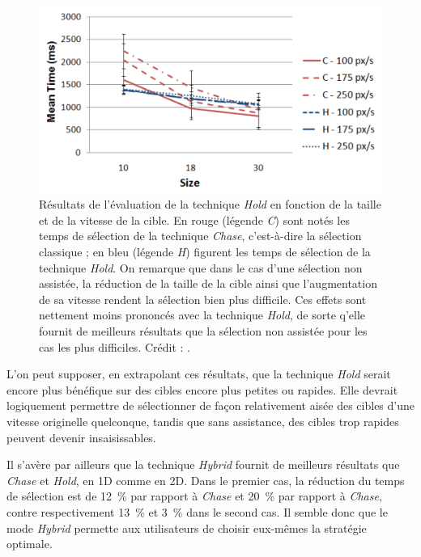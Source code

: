 	\begin{figure}[H]
		\centering
		\includegraphics[width=\textwidth]{figures/ch2/holdSFast}
		\caption[\emph{Hold} --- petites cibles rapides]{Résultats de l'évaluation de la technique \emph{Hold} en fonction de la taille et de la vitesse de la cible. En rouge (légende \emph{C}) sont notés les temps de sélection de la technique \emph{Chase}, c'est-à-dire la sélection classique ; en bleu (légende \emph{H}) figurent les temps de sélection de la technique \emph{Hold}. On remarque que dans le cas d'une sélection non assistée, la réduction de la taille de la cible ainsi que l'augmentation de sa vitesse rendent la sélection bien plus difficile. Ces effets sont nettement moins prononcés avec la technique \emph{Hold}, de sorte q'elle fournit de meilleurs résultats que la sélection non assistée pour les cas les plus difficiles. Crédit : \cite{hajri2011moving}.}
		\label{fig:holdSFast}
	\end{figure}
	
	L'on peut supposer, en extrapolant ces résultats, que la technique \emph{Hold} serait encore plus bénéfique sur des cibles encore plus petites ou rapides. Elle devrait logiquement permettre de sélectionner de façon relativement aisée des cibles d'une vitesse originelle quelconque, tandis que sans assistance, des cibles trop rapides peuvent devenir insaisissables.
	
	Il s'avère par ailleurs que la technique \emph{Hybrid} fournit de meilleurs résultats que \emph{Chase} et \emph{Hold}, en 1D comme en 2D. Dans le premier cas, la réduction du temps de sélection est de 12~\%{} par rapport à \emph{Chase} et 20~\%{} par rapport à \emph{Chase}, contre respectivement 13~\%{} et 3~\%{} dans le second cas. Il semble donc que le mode \emph{Hybrid} permette aux utilisateurs de choisir eux-mêmes la stratégie optimale.
	

